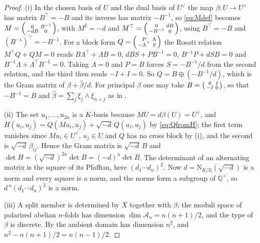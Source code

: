 \documentclass[11pt,reqno]{amsart}
\theoremstyle{plain}
\theoremstyle{definition}
\theoremstyle{remark}
\newcommand{\QQ}{\mathbb{Q}}
\newcommand{\cA}{\mathcal{A}}
\newcommand{\Nm}{\mathrm{N}}             %
\begin{document}
\begin{proof}
(i) In the chosen basis of $U$ and the dual basis of $U^{\vee}$ the map
$\beta\colon U\to U^{\vee}$ has matrix $B^{\top}=-B$ and its inverse has
matrix $-B^{-1}$, so \eqref{eq:Mdef} becomes
$M=\begin{psmallmatrix}0&B^{-1}\\-dB&0\end{psmallmatrix}$, with
$M^{2}=-d$ and
$M^{\top}=\begin{psmallmatrix}0&dB\\-B^{-1}&0\end{psmallmatrix}$, using
$B^{\top}=-B$ and $(B^{-1})^{\top}=-B^{-1}$. For a block form
$Q=\begin{psmallmatrix}P&\Lambda\\-\Lambda^{\top}&S\end{psmallmatrix}$ the
Rosati relation $M^{\top}Q+QM=0$ reads
$B\Lambda^{\top}+\Lambda B=0$, $dBS+PB^{-1}=0$, $B^{-1}P+dSB=0$ and
$B^{-1}\Lambda+\Lambda^{\top}B^{-1}=0$. Taking $\Lambda=0$ and $P=B$ forces
$S=-B^{-1}/d$ from the second relation, and the third then reads $-I+I=0$.
So $Q=B\oplus(-B^{-1}/d)$, which is the Gram matrix of
$\beta+\widehat\beta/d$. For principal $\beta$ one may take
$B=\begin{psmallmatrix}0&I\\-I&0\end{psmallmatrix}$, so that $-B^{-1}=B$
and $\widehat\beta=\sum_{j}\xi_{j}\wedge\xi_{n+j}$ as in
.

(ii) The set $u_{1},\dots,u_{2n}$ is a $K$-basis because
$MU=d\beta(U)=U^{\vee}$, and $H(u_{i},u_{j})=Q(Mu_{i},u_{j})+\sqrt{-d}\,Q(u_{i},u_{j})$
by \eqref{eq:QfromH}; the first term vanishes since $Mu_{i}\in U^{\vee}$,
$u_{j}\in U$ and $Q$ has no cross block by (i), and the second is
$\sqrt{-d}\,\beta_{ij}$. Hence the Gram matrix is $\sqrt{-d}\,B$ and
$\det H=(\sqrt{-d})^{2n}\det B=(-d)^{n}\det B$. The determinant of an
alternating matrix is the square of its Pfaffian, here $(d_{1}\cdots
d_{n})^{2}$. Now $d=\Nm_{K/\QQ}(\sqrt{-d})$ is a norm and every square is a
norm, and the norms form a subgroup of $\QQ^{\times}$, so
$d^{\,n}(d_{1}\cdots d_{n})^{2}$ is a norm.

(iii) A split member is determined by $X$ together with $\beta$; the moduli
space of polarised abelian $n$-folds has dimension $\dim\cA_{n}=n(n+1)/2$,
and the type of $\beta$ is discrete. By  the ambient domain has
dimension $n^{2}$, and $n^{2}-n(n+1)/2=n(n-1)/2$.


\end{proof}
\end{document}
